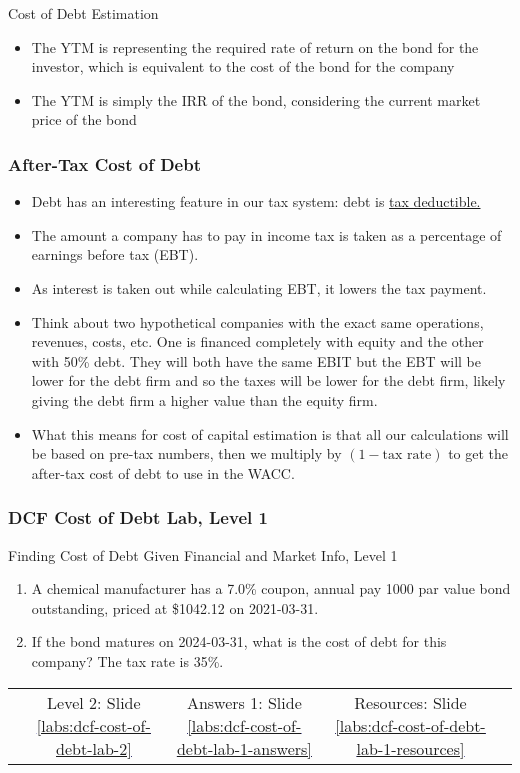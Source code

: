 \documentclass[handout, 11pt]{beamer}
\begin{document}
\begin{section}[Debt]{Cost of Debt Estimation}
\begin{frame}
\begin{itemize}
\vfill
\item The YTM is representing the required rate of return on the bond for the investor, which is equivalent to the cost of the bond for the company
\vfill
\item The YTM is simply the IRR of the bond, considering the current market price of the bond
\end{itemize}
\end{frame}
\begin{frame}
\frametitle{After-Tax Cost of Debt}
\begin{itemize}
\small
\vfill
\item Debt has an interesting feature in our tax system: debt is
\underline{tax deductible.}
\vfill
\item The amount a company has to pay in income tax is taken as a percentage of earnings before tax (EBT).
\vfill
\item As interest is taken out while calculating EBT, it lowers the tax payment.
\vfill
\item Think about two hypothetical companies with the exact same operations, revenues, costs, etc. One is financed completely with equity and the other with 50\% debt. They will both have the same EBIT but the EBT will be lower for the debt firm and so the taxes will be lower for the debt firm, likely giving the debt firm a higher value than the equity firm.
\vfill
\item What this means for cost of capital estimation is that all our calculations will be based on pre-tax numbers, then we multiply by $(1 - \text{tax rate})$ to get the after-tax cost of debt to use in the WACC.
\end{itemize}
\end{frame}
\begin{frame}
\frametitle{DCF Cost of Debt Lab, Level 1}
{
\begin{block}{Finding Cost of Debt Given Financial and Market Info, Level 1}
\begin{enumerate}
\item A chemical manufacturer has a 7.0\% coupon, annual pay 1000 par value bond outstanding, priced at \$1042.12 on 2021-03-31.
\item If the bond matures on 2024-03-31, what is the cost of debt for this company? The tax rate is 35\%.
\end{enumerate}
\vfill
\begin{tabular*}{\textwidth}{@{\extracolsep{\fill}}ccccc}
\toprule
\hfill & Level 2: Slide \textcolor{blue}{\underline{\ref{labs:dcf-cost-of-debt-lab-2}}} & Answers 1: Slide \textcolor{blue}{\underline{\ref{labs:dcf-cost-of-debt-lab-1-answers}}} & Resources: Slide \textcolor{blue}{\underline{\ref{labs:dcf-cost-of-debt-lab-1-resources}}} & \hfill\\


\end{tabular*}
\end{block}}
\end{frame}
\end{section}
\end{document}
